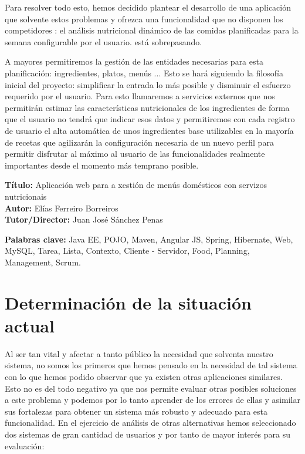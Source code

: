\documentclass[12pt, a4paper, twoside]{book}
\begin{document}
	Para resolver todo esto, hemos decidido plantear el desarrollo de una aplicación que solvente estos problemas y ofrezca una funcionalidad que no disponen los competidores : el análisis nutricional dinámico de las comidas planificadas para la semana configurable por el usuario. está sobrepasando.
	
	A mayores permitiremos la gestión de las entidades necesarias para esta planificación: ingredientes, platos, menús ... 
	Esto se hará siguiendo la filosofía inicial del proyecto: simplificar la entrada lo más posible y disminuir el esfuerzo requerido por el usuario. 
	Para esto llamaremos a servicios externos que nos permitirán estimar las características nutricionales de los ingredientes de forma que el usuario no tendrá que indicar esos datos y permitiremos con cada registro de usuario el alta automática de unos ingredientes base utilizables en la mayoría de recetas que agilizarán la configuración necesaria de un nuevo perfil para permitir disfrutar al máximo al usuario de las funcionalidades realmente importantes desde el momento más temprano posible.
	
	\clearpage
	
	\textbf{Título:} Aplicación web para a xestión de menús domésticos con servizos nutricionais
	\\
	\textbf{Autor:} Elías Ferreiro Borreiros
	\\
	\textbf{Tutor/Director:} Juan José Sánchez Penas
	
	
	\textbf{Palabras clave:} Java EE, POJO, Maven, Angular JS, Spring, Hibernate, Web, MySQL, Tarea, Lista, Contexto, Cliente - Servidor, Food, Planning, Management, Scrum. 
	
	
	\renewcommand{\contentsname}{Índice de contenidos}
	\renewcommand{\listfigurename}{Índice de figuras}
	\renewcommand{\listtablename}{Índice de tablas}
	
	\tableofcontents %
	
	\listoffigures %
	
	\listoftables %
	
	\clearpage
	
	\chapter{Determinación de la situación actual}
	Al ser tan vital y afectar a tanto público la necesidad que solventa nuestro sistema, no somos los primeros que hemos pensado en la necesidad de tal sistema con lo que hemos podido observar que ya existen otras aplicaciones similares.
	Esto no es del todo negativo ya que nos permite evaluar otras posibles soluciones a este problema y podemos por lo tanto aprender de los errores de ellas y asimilar sus fortalezas para obtener un sistema más robusto y adecuado para esta funcionalidad.
	En el ejercicio de análisis de otras alternativas hemos seleccionado dos sistemas de gran cantidad de usuarios y por tanto de mayor interés para su evaluación:
\end{document}
